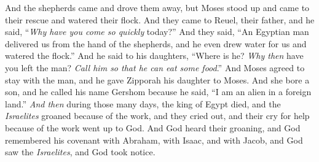 \begin{biblechapter}
\verse And the shepherds came and drove them away, but Moses stood up and came to their rescue and watered their flock.
\verse And they came to Reuel, their father, and he said, “\textit{Why have you come so quickly} today?”
\verse And they said, “An Egyptian man delivered us from the hand of the shepherds, and he even drew water for us and watered the flock.”
\verse And he said to his daughters, “Where is he? \textit{Why then} have you left the man? \textit{Call him so that he can eat some food}.”
\verse And Moses agreed to stay with the man, and he gave Zipporah his daughter to Moses.
\verse And she bore a son, and he called his name Gershom because he said, “I am an alien in a foreign land.”
\verse \textit{And then} during those many days, the king of Egypt died, and the \textit{Israelites} groaned because of the work, and they cried out, and their cry for help because of the work went up to God.
\verse And God heard their groaning, and God remembered his covenant with Abraham, with Isaac, and with Jacob,
\verse and God saw the \textit{Israelites}, and God took notice.
\end{biblechapter}

